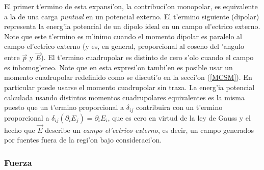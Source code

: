 El primer t'ermino de esta expansi'on, la contribuci'on monopolar, es
equivalente a la de una carga \textit{puntual} en un potencial externo. El
t'ermino siguiente (dipolar) representa la energ'ia potencial de un dipolo
ideal en un campo el'ectrico externo. Note que este t'ermino es m'inimo cuando
el momento dipolar es paralelo al campo el'ectrico externo (y es, en general,
proporcional al coseno del 'angulo entre $\vec{p}$ y $\vec{E}$). El t'ermino
cuadrupolar es distinto de cero s'olo cuando el campo es inhomog'eneo. Note que
en esta expresi'on tambi'en es posible usar un momento cuadrupolar redefinido
como se discuti'o en la secci'on (\ref{MCSM}). En particular puede usarse el
momento cuadrupolar sin traza. La energ'ia potencial calculada usando distintos
momentos cuadrupolares equivalentes es la misma puesto que un t'ermino
proporcional a $\delta_{ij}$ contribuira con un t'ermino proporcional a
$\delta_{ij}(\partial_iE_j)=\partial_iE_i$, que es cero en virtud de la ley de
Gauss y el hecho que $\vec{E}$ describe un \textit{campo el'ectrico externo},
es decir, un campo generados por fuentes fuera de la regi'on bajo
consideraci'on.


\subsubsection{Fuerza}  \label{ed3_3_2}

